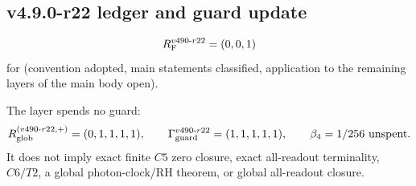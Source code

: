\subsection*{v4.9.0-r22 ledger and guard update}
\label{subsec:v490-r22-ledger-guard}

\[
R_{\rm F}^{v490\text{-}r22}=(0,0,1)
\]
for (convention adopted, main statements classified, application to the remaining layers of the main body open).

The layer spends no guard:
\[
R_{\rm glob}^{(v490\text{-}r22,+)}=(0,1,1,1,1),
\qquad
\Gamma_{\rm guard}^{v490\text{-}r22}=(1,1,1,1,1),
\qquad
\beta_4=1/256\ \text{unspent}.
\]
It does not imply exact finite \(C5\) zero closure, exact all-readout terminality,
\(C6/T2\), a global photon-clock/RH theorem, or global all-readout closure.


